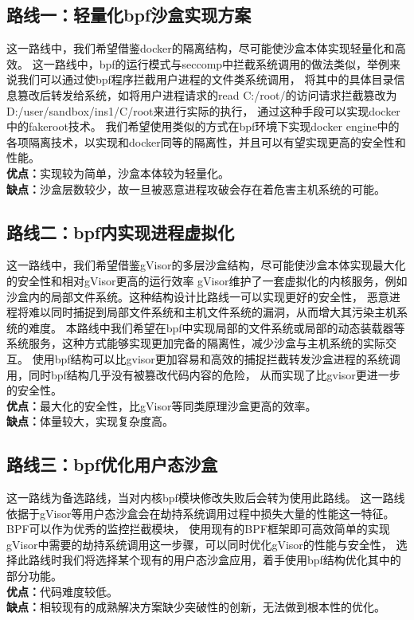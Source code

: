 \documentclass[AutoFakeBold,a4paper]{ctexart}
\begin{document}
\subsection{路线一：轻量化bpf沙盒实现方案}\label{路线一}
这一路线中，我们希望借鉴docker的隔离结构，尽可能使沙盒本体实现轻量化和高效。
这一路线中，bpf的运行模式与seccomp中拦截系统调用的做法类似，举例来说我们可以通过使bpf程序拦截用户进程的文件类系统调用，
将其中的具体目录信息篡改后转发给系统，如将用户进程请求的read C:/root/的访问请求拦截篡改为D:/user/sandbox/ins1/C/root来进行实际的执行，
通过这种手段可以实现docker中的fakeroot技术。
我们希望使用类似的方式在bpf环境下实现docker engine中的各项隔离技术，以实现和docker同等的隔离性，并且可以有望实现更高的安全性和性能。\\
\textbf{优点：}实现较为简单，沙盒本体较为轻量化。\\
\textbf{缺点：}沙盒层数较少，故一旦被恶意进程攻破会存在着危害主机系统的可能。

\subsection{路线二：bpf内实现进程虚拟化}\label{路线二}
这一路线中，我们希望借鉴gVisor的多层沙盒结构，尽可能使沙盒本体实现最大化的安全性和相对gVisor更高的运行效率
gVisor维护了一套虚拟化的内核服务，例如沙盒内的局部文件系统。这种结构设计比路线一可以实现更好的安全性，
恶意进程将难以同时捕捉到局部文件系统和主机文件系统的漏洞，从而增大其污染主机系统的难度。
本路线中我们希望在bpf中实现局部的文件系统或局部的动态装载器等系统服务，这种方式能够实现更加完备的隔离性，减少沙盒与主机系统的实际交互。
使用bpf结构可以比gvisor更加容易和高效的捕捉拦截转发沙盒进程的系统调用，同时bpf结构几乎没有被篡改代码内容的危险，
从而实现了比gvisor更进一步的安全性。\\
\textbf{优点：}最大化的安全性，比gVisor等同类原理沙盒更高的效率。\\
\textbf{缺点：}体量较大，实现复杂度高。

\subsection{路线三：bpf优化用户态沙盒}\label{路线三}
这一路线为备选路线，当对内核bpf模块修改失败后会转为使用此路线。
这一路线依据于gVisor等用户态沙盒会在劫持系统调用过程中损失大量的性能这一特征。BPF可以作为优秀的监控拦截模块，
使用现有的BPF框架即可高效简单的实现gVisor中需要的劫持系统调用这一步骤，可以同时优化gVisor的性能与安全性，
选择此路线时我们将选择某个现有的用户态沙盒应用，着手使用bpf结构优化其中的部分功能。\\
\textbf{优点：}代码难度较低。\\
\textbf{缺点：}相较现有的成熟解决方案缺少突破性的创新，无法做到根本性的优化。









% 
\end{document}
